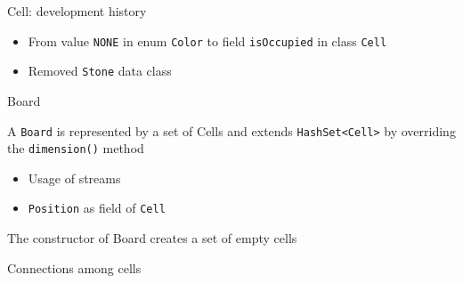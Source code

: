 \documentclass{beamer}
\begin{document}
\begin{frame}{Cell: development history}
\begin{itemize}
\item From value \texttt{NONE} in enum \texttt{Color} to field \texttt{isOccupied} in class \texttt{Cell}
\item Removed \texttt{Stone} data class
\end{itemize}


\end{frame}


\begin{frame}{Board}

A \texttt{Board} is represented by a set of Cells and extends \texttt{HashSet<Cell>} by overriding the \texttt{dimension()} method
\begin{itemize}
    \item Usage of streams
    \item \texttt{Position} as field of \texttt{Cell}    
\end{itemize}




The constructor of Board creates a set of empty cells

\end{frame}


\begin{frame}{Connections among cells}


\end{frame}
     
\end{document}
